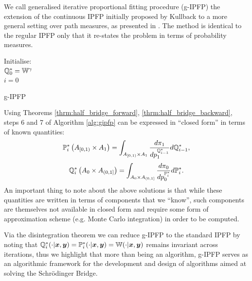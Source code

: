 \documentclass[a4paper,12pt,twoside,openright]{report}
\theoremstyle{definition}
\begin{document}
We call generalised iterative proportional fitting procedure (g-IPFP) the extension of the continuous IPFP initially proposed by Kullback to a more general setting over path measures, as presented in \cite{cramer2000probability, bernton2019schr}. The method is identical to the regular IPFP only that it re-states the problem in terms of probability measures.
\begin{algorithm} \label{alg:gipfp}
Initialise:\\
${\mathbb{Q}}^{*}_0 =\mathbb{W}^{\gamma}$\\
$i=0$ \\
\caption{g-IPFP \citep{cramer2000probability} }
\end{algorithm}

Using Theorems \ref{thrm:half_bridge_forward}, \ref{thrm:half_bridge_backward}, steps 6 and 7 of Algorithm \ref{alg:gipfp} can be expressed in ``closed form'' in terms of known quantities:
\begin{align}
    {{\mathbb{P}}}^{*}_i\left( A_{[0,1)} \times A_1\right) =  \int_{ A_{[0,1)} \times A_1}  \frac{d \pi_1}{ d p_1^{{\mathbb{Q}}^{*}_{i-1}}} d{\mathbb{Q}}^{*}_{i-1},
\end{align}
\begin{align}
    {{\mathbb{Q}}}^{*}_i\left(A_0 \times A_{(0,1]}\right) =  \int_{A_0\times A_{(0,1]}} \frac{d \pi_0}{ dp_0^{{\mathbb{P}}^{*}_i}} d{\mathbb{P}}^{*}_i.
\end{align}
An important thing to note about the above solutions is that while these quantities are written in terms of components that we ``know'', such components are themselves not available in closed form and require some form of approximation scheme (e.g. Monte Carlo integration) in order to be computed.

Via the disintegration theorem we can reduce g-IPFP to the standard IPFP by noting that ${\mathbb{Q}}^*_i(\cdot |{\bm{x}},{\bm{y}}) ={\mathbb{P}}^*_i(\cdot |{\bm{x}},{\bm{y}}) = \mathbb{W}(\cdot |{\bm{x}},{\bm{y}})$ remains invariant across iterations, thus we highlight that more than being an algorithm, g-IPFP serves as an algorithmic framework for the development and design of algorithms aimed at solving the Schrödinger Bridge.
\end{document}
